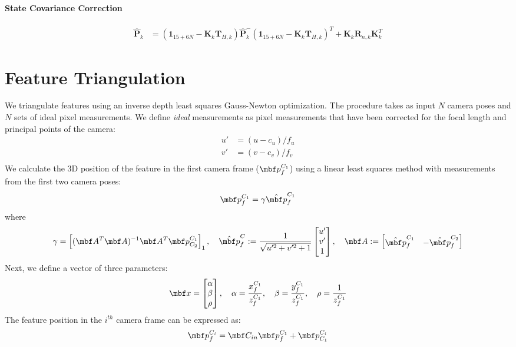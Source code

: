 \documentclass[10pt,letterpaper,fleqn,oneside]{article}
\def\Vec#1{\mathbf{#1}} %
\newcommand{\bbm}{\begin{bmatrix}}
\newcommand{\ebm}{\end{bmatrix}}
\begin{document}
\paragraph{State Covariance Correction}
\begin{align}
\hat{\Vec{P}}_k &= \left(\Vec{1}_{15+6N} - \Vec{K}_k\Vec{T}_{H,k} \right)\hat{\Vec{P}}^-_k\left(\Vec{1}_{15+6N} - \Vec{K}_k\Vec{T}_{H,k} \right)^T + \Vec{K}_k\Vec{R}_{n,k}\Vec{K}_k^T
\end{align}

\section{Feature Triangulation}

We triangulate features using an inverse depth least squares Gauss-Newton optimization. The procedure takes as input $N$ camera poses and $N$ sets of ideal pixel measurements. We define \textit{ideal} measurements as pixel measurements that have been corrected for the focal length and principal points of the camera:
\begin{align}
u' &= (u - c_u)/f_u \\
v' &= (v - c_v)/f_v \\
\end{align}
We calculate the 3D position of the feature in the first camera frame ($\mbf p^{C_1}_{f}$) using  a linear least squares method with measurements from the first two camera poses:
\begin{align}
\mbf p^{C_1}_{f} = \gamma \hat{\mbf p}^{C_1}_{f} 
\end{align}
where
\begin{align}
\gamma = \left[(\mbf A^T \mbf A)^{-1} \mbf A^T \mbf p^{C_1}_{C_2} \right]_1, \quad \hat{\mbf p}^{C}_{f} := \frac{1}{\sqrt{u'^2 + v'^2 + 1}}\bbm u' \\ v' \\ 1\ebm , \quad \mbf A := \bbm \hat{\mbf p}^{C_1}_{f} & -\hat{\mbf p}^{C_2}_{f} \ebm
\end{align}
Next, we define a vector of three parameters:
\begin{align}
\mbf x = \bbm \alpha \\ \beta \\ \rho \ebm, \quad \alpha = \frac{x^{C_1}_{f}}{z^{C_1}_{f}}, \quad \beta = \frac{y^{C_1}_{f}}{z^{C_1}_{f}}, \quad \rho = \frac{1}{z^{C_1}_{f}}
\end{align}
The feature position in the $i^{th}$ camera frame can be expressed as:
\begin{align}
\mbf p^{C_i}_{f} = \mbf C_{in} \mbf p^{C_1}_{f}  + \mbf p^{C_i}_{C_1}
\end{align}
\end{document}

